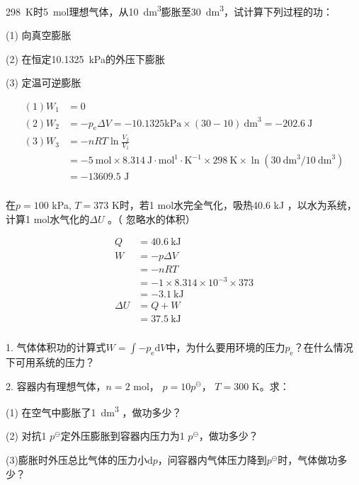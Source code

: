 \documentclass[dvipsnames, svgnames, x11names]{beamer}
\begin{document}
\begin{frame}[t]
	\frametitle{}
	\begin{example}
		\SI{298}{K}时\SI{5}{mol}理想气体，从\SI{10}{dm^3}膨胀至\SI{30}{dm^3}，试计算下列过程的功：

		(1) 向真空膨胀

		(2) 在恒定\SI{10.1325}{kPa}的外压下膨胀

		(3) 定温可逆膨胀
	\end{example}
	\vspace{-8pt}
	\pause
	\[
		\begin{aligned}
			 (1) W_1&=0\\
			 (2) W_2&=-p_\mathrm{e}\Delta V=-10.1325\text{kPa}\times(30-10)\mathrm{~dm}^3=-202.6\mathrm{~J}\\
			 (3) W_3&=-nRT\ln\frac{V_2}{V_1}\\
					& =-5\mathrm{~mol}\times8.314\mathrm{~J}\cdot\mathrm{mol}^1\cdot\mathrm{K}^{-1}\times298\mathrm{~K}\times\ln(30\mathrm{~dm}^3/10\mathrm{~dm}^3)\\
					& =-\text{13609.5 J}
		\end{aligned}
	\]
\end{frame}


\begin{frame}[t]
	\frametitle{}
	\begin{example}
		在$p = 100$ kPa, $T = 373$ K时，若1 mol水完全气化，吸热40.6 kJ ，以水为系统，计算1 mol水气化的$\Delta U$ 。（ 忽略水的体积）
	\end{example}
	\[
		\begin{aligned}
			Q&=40.6 \mathrm{\ kJ} \\
			W&=-p\Delta V\\
			&=-nRT \\
			&=-1\times 8.314 \times 10^{-3}\times 373 \\
			&=-3.1\mathrm{\ kJ} \\
			{\Delta U}&={Q}+{W} \\
			&={37.5}\mathrm{\ kJ}
		\end{aligned}
	\]
\end{frame}


\begin{frame}[t]
	\frametitle{}
	\begin{question}
		1. 气体体积功的计算式$W=\int-p_\mathrm{e}\mathrm{d}V$中，为什么要用环境的压力$p_\mathrm{e}$？在什么情况下可用系统的压力？

		2. 容器内有理想气体，$n = 2$ mol， $p = 10 p^{\ominus}$， $T = 300$ K。求：
		
		(1) 在空气中膨胀了\SI{1}{dm^3} ，做功多少？
		
		(2) 对抗1 $p^{\ominus}$定外压膨胀到容器内压力为1 $p^{\ominus}$，做功多少？
		
		(3)膨胀时外压总比气体的压力小$\mathrm{d}p$，问容器内气体压力降到$p^{\ominus}$时，气体做功多少？
	\end{question}
\end{frame}
\end{document}
